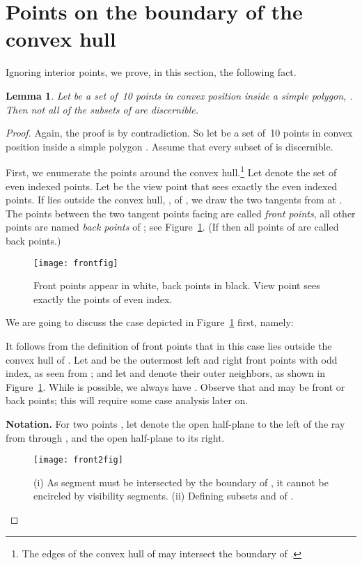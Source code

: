 \documentclass[11pt]{article}
\newtheorem{lemma}{Lemma}
\begin{document}
\bigskip
\section{Points on the boundary of the convex hull}         \label{outer-sec}Ignoring interior points, we prove, in this section, the following fact.

\begin{lemma}            \label{outer-lem}
Let  be a set of~10 points in convex position inside a simple polygon, . 
Then not all of the subsets of  are discernible.
\end{lemma}
\begin{proof}
Again, the proof is by contradiction. So let  be a set of~10 points
in convex position inside a simple polygon . Assume that every subset of
 is discernible.

First, we enumerate the points around the convex hull.\footnote{The edges of the convex hull of  may intersect the boundary of .
} 
Let  denote the set of even indexed points. 
Let  be the view point that sees exactly the even indexed points. If  lies outside the convex hull, 
, of , we draw the 
two tangents from  at . The points between the two tangent points 
facing  are called {\em front points}, all other
points are named  {\em back points} of ; see Figure~\ref{front-fig}.
(If  then all points of  are called back points.)
 
 
\begin{figure}[htbp]\begin{center}\texttt{[image: frontfig]}\caption{Front points appear in white, back points in black. View point 
    sees exactly the points of even index.}\label{front-fig}
  \end{center}\end{figure}


We are going to discuss the case depicted in Figure~\ref{front-fig} first, namely:


It follows from the definition of front points that in this case  lies outside the convex hull of .
Let  and  be the outermost left and right front points with odd index, as seen from ;
and let  and  denote their outer neighbors, as shown in Figure~\ref{front-fig}.
While  is possible, we always have . Observe that  and
 may be front or back points; this will require some case analysis later on.

{\bf Notation.}
For two points , let   denote the open half-plane to the left of the
ray  from  through , and  the open half-plane to its right.
\begin{figure*}[hbtp]\begin{center}\texttt{[image: front2fig]}\caption{(i) As segment  must be intersected by the boundary of , it cannot
    be encircled by visibility segments. (ii) Defining subsets  and  of .}\label{front2-fig}
  \end{center}\end{figure*}



\end{proof}
\end{document}
